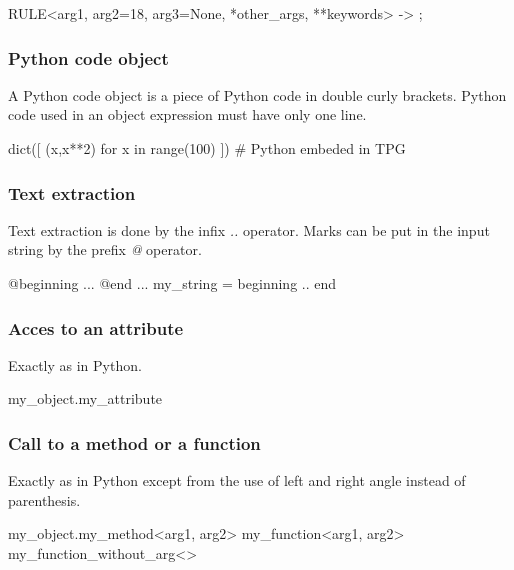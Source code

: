 \begin{verbatimtab}[4]
	RULE<arg1, arg2=18, arg3=None, *other_args, **keywords> -> ;
\end{verbatimtab}

\subsubsection{Python code object}

A Python code object is a piece of Python code in double curly brackets.
Python code used in an object expression must have only one line.

\begin{verbatimtab}[4]
	{{ dict([ (x,x**2) for x in range(100) ]) # Python embeded in TPG }}
\end{verbatimtab}

\subsubsection{Text extraction}

Text extraction is done by the infix \emph{..} operator.
Marks can be put in the input string by the prefix \emph{@} operator.

\begin{verbatimtab}[4]
	@beginning
	...
	@end
	...
	my_string = beginning .. end
\end{verbatimtab}

\subsubsection{Acces to an attribute}

Exactly as in Python.

\begin{verbatimtab}[4]
	my_object.my_attribute
\end{verbatimtab}

\subsubsection{Call to a method or a function}

Exactly as in Python except from the use of left and right angle instead of parenthesis.

\begin{verbatimtab}[4]
	my_object.my_method<arg1, arg2>
	my_function<arg1, arg2>
	my_function_without_arg<>
\end{verbatimtab}


